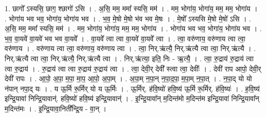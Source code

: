 \documentclass[17pt]{extarticle}
\begin{document}
1. छागो᳚ ऽस्यसि॒ छाग॒ श्छागो॑ ऽसि । . अ॒सि॒ मम॒ ममा᳚ स्यसि॒ मम॑ । . मम॒ भोगा॑य॒ भोगा॑य॒ मम॒ मम॒ भोगा॑य । . भोगा॑य भव भव॒ भोगा॑य॒ भोगा॑य भव । . भ॒व॒ मे॒षो मे॒षो भ॑व भव मे॒षः । . मे॒षो᳚ ऽस्यसि मे॒षो मे॒षो॑ ऽसि । . अ॒सि॒ मम॒ ममा᳚ स्यसि॒ मम॑ । . मम॒ भोगा॑य॒ भोगा॑य॒ मम॒ मम॒ भोगा॑य । . भोगा॑य भव भव॒ भोगा॑य॒ भोगा॑य भव । . भ॒व॒ वा॒यवे॑ वा॒यवे॑ भव भव वा॒यवे᳚ । . वा॒यवे᳚ त्वा त्वा वा॒यवे॑ वा॒यवे᳚ त्वा । . त्वा॒ वरु॑णाय॒ वरु॑णाय त्वा त्वा॒ वरु॑णाय । . वरु॑णाय त्वा त्वा॒ वरु॑णाय॒ वरु॑णाय त्वा । . त्वा॒ निर्.ऋ॑त्यै॒ निर्.ऋ॑त्यै त्वा त्वा॒ निर्.ऋ॑त्यै । . निर्.ऋ॑त्यै त्वा त्वा॒ निर्.ऋ॑त्यै॒ निर्.ऋ॑त्यै त्वा । . निर्.ऋ॑त्या॒ इति॒ निः - ऋ॒त्यै॒ । . त्वा॒ रु॒द्राय॑ रु॒द्राय॑ त्वा त्वा रु॒द्राय॑ । . रु॒द्राय॑ त्वा त्वा रु॒द्राय॑ रु॒द्राय॑ त्वा । . त्वा॒ देवी॒र् देवी᳚ स्त्वा त्वा॒ देवीः᳚ । . देवी॑ राप आपो॒ देवी॒र् देवी॑ रापः । . आ॒पो॒ अ॒पा॒ म॒पा॒ मा॒प॒ आ॒पो॒ अ॒पा॒म् । . अ॒पा॒म् न॒पा॒न् न॒पा॒द॒पा॒ म॒पा॒म् न॒पा॒त् । . न॒पा॒द् यो यो न॑पान् नपा॒द् यः । . य ऊ॒र्मि रू॒र्मिर् यो य ऊ॒र्मिः । . ऊ॒र्मिर्. ह॑वि॒ष्यो॑ हवि॒ष्य॑ ऊ॒र्मि रू॒र्मिर्. ह॑वि॒ष्यः॑ । . ह॒वि॒ष्य॑ इन्द्रि॒यावा॑ निन्द्रि॒यावान्॑. हवि॒ष्यो॑ हवि॒ष्य॑ इन्द्रि॒यावान्॑ । . इ॒न्द्रि॒यावा᳚न् म॒दिन्त॑मो म॒दिन्त॑म इन्द्रि॒यावा॑ निन्द्रि॒यावा᳚न् म॒दिन्त॑मः । . इ॒न्द्रि॒यावा॒निती᳚न्द्रि॒य - वा॒न् । \newline
\end{document}
